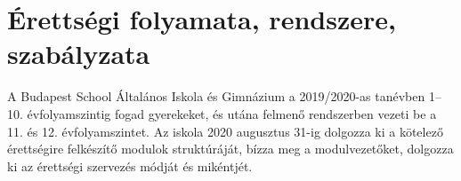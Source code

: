 \section{Érettségi folyamata, rendszere, szabályzata}
A Budapest School Általános Iskola és Gimnázium a 2019/2020-as tanévben 1--10. évfolyamszintig fogad gyerekeket, és utána felmenő rendszerben vezeti be a 11. és 12. évfolyamszintet. Az iskola 2020 augusztus 31-ig dolgozza ki a kötelező érettségire felkészítő modulok struktúráját, bízza meg a modulvezetőket, dolgozza ki az érettségi szervezés módját és mikéntjét. 
